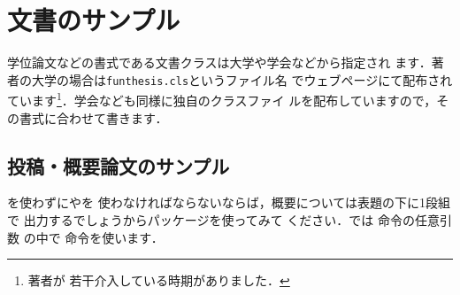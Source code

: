\chapter{文書のサンプル}
\begin{abstract}
\end{abstract}

学位論文などの書式である文書クラスは大学や学会などから指定され
ます．著者の大学の場合は\texttt{funthesis.cls}というファイル名
でウェブページにて配布されています\footnote{著者が
若干介入している時期がありました．}．学会なども同様に独自のクラスファイ
ルを配布していますので，その書式に合わせて書きます．

\section{投稿・概要論文のサンプル}


を使わずにやを
使わなければならないならば，概要については表題の下に1段組で
出力するでしょうからパッケージを使ってみて
ください．では 命令の任意引数
の中で 命令を使います．

\begin{InTeX}
\end{InTeX}

